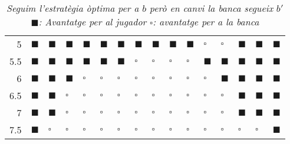 \documentclass[9pt]{IEEEtran}
\begin{document}
\begin{table*}[htb]
\begin{center}
\begin{tabular}{rlllllllllllllll}
  5 & $\blacksquare$ & $\blacksquare$ & $\blacksquare$& $\blacksquare$ & $\blacksquare$& $\blacksquare$ & $\blacksquare$ &$\blacksquare$ & $\blacksquare$ & $\blacksquare$ & $\square$ & $\square$ & $\blacksquare$ & $\blacksquare$ & $\blacksquare$ \\ 
  5.5 & $\blacksquare$ & $\blacksquare$ & $\blacksquare$ & $\blacksquare$ & $\blacksquare$ & $\blacksquare$ & $\square$ & $\square$& $\square$& $\square$& $\blacksquare$ & $\blacksquare$ & $\blacksquare$ & $\blacksquare$ & $\blacksquare$ \\ 
  6 & $\blacksquare$ & $\blacksquare$ & $\blacksquare$ &$\square$ &$\square$ &$\square$ & $\square$& $\square$ & $\square$ & $\square$ & $\square$ & $\blacksquare$ & $\blacksquare$ &$\blacksquare$& $\blacksquare$ \\ 
  6.5 & $\blacksquare$ & $\blacksquare$ &$\square$ & $\square$ & $\square$ & $\square$ & $\square$& $\square$ & $\square$ & $\square$ & $\square$ &$\square$ &$\blacksquare$ & $\blacksquare$ & $\blacksquare$ \\ 
  7 & $\blacksquare$ & $\blacksquare$ & $\square$ & $\square$ &$\square$ &$\square$ & $\square$ & $\square$& $\square$ & $\square$& $\square$ & $\square$& $\blacksquare$ & $\blacksquare$ & $\blacksquare$ \\ 
  7.5 &$\blacksquare$ & $\square$ & $\square$ &$\square$ &$\square$ & $\square$ & $\square$& $\square$&$\square$ & $\square$ &$\square$ & $\square$ & $\square$ & $\square$ & $\blacksquare$ \\ 
   \hline
\end{tabular}
\end{center}
\caption{\textit{Seguim l'estratègia òptima per a $b$ però en canvi la banca segueix $b'$\\
$\blacksquare$: Avantatge per al jugador $\square$: avantatge per a la banca}}
\label{avantatge}
\end{table*}
\end{document}

